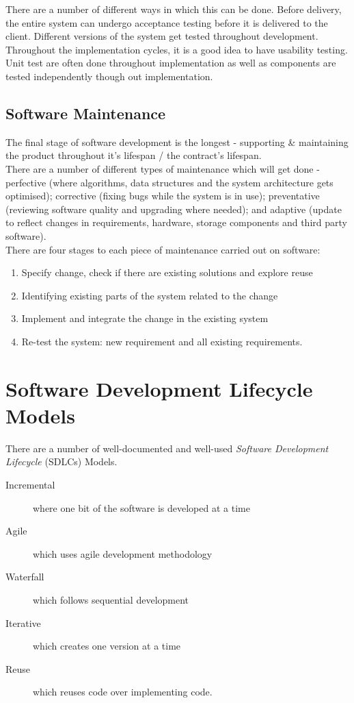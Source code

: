 There are a number of different ways in which this can be done. Before delivery, the entire system can undergo acceptance testing before it is delivered to the client. Different versions of the system get tested throughout development. Throughout the implementation cycles, it is a good idea to have usability testing. Unit test are often done throughout implementation as well as components are tested independently though out implementation.

\subsection{Software Maintenance}
The final stage of software development is the longest - supporting \& maintaining the product throughout it's lifespan / the contract's lifespan.\\

There are a number of different types of maintenance which will get done - perfective (where algorithms, data structures and the system architecture gets optimised); corrective (fixing bugs while the system is in use); preventative (reviewing software quality and upgrading where needed); and adaptive (update to reflect changes in requirements, hardware, storage components and third party software). \\

There are four stages to each piece of maintenance carried out on software:
\begin{enumerate}
    \item Specify change, check if there are existing solutions and explore reuse
    \item Identifying existing parts of the system related to the change
    \item Implement and integrate the change in the existing system
    \item Re-test the system: new requirement and all existing requirements.
\end{enumerate}

\section{Software Development Lifecycle Models}
There are a number of well-documented and well-used \textit{Software Development Lifecycle} (SDLCs) Models.
\begin{description}
    \item[Incremental] where one bit of the software is developed at a time
    \item[Agile] which uses agile development methodology
    \item[Waterfall] which follows sequential development
    \item[Iterative] which creates one version at a time
    \item[Reuse] which reuses code over implementing code.
\end{description}

